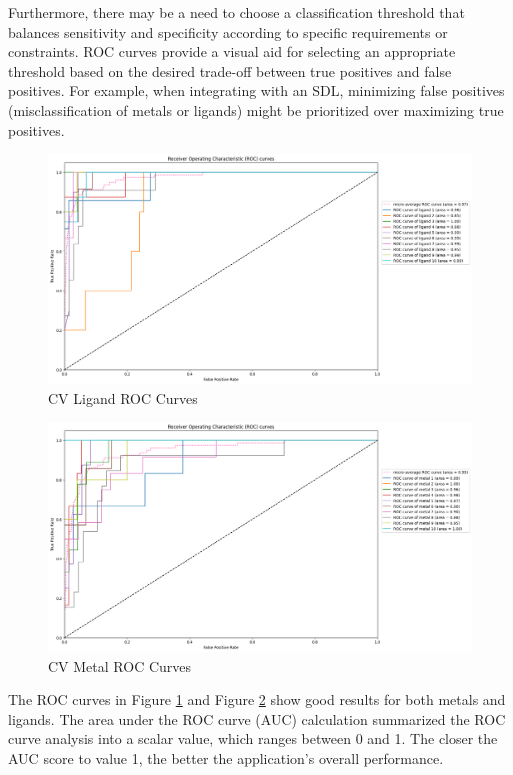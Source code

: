 Furthermore, there may be a need to choose a classification threshold that balances sensitivity and specificity according to specific requirements or constraints. ROC curves provide a visual aid for selecting an appropriate threshold based on the desired trade-off between true positives and false positives. For example, when integrating with an SDL, minimizing false positives (misclassification of metals or ligands) might be prioritized over maximizing true positives.
\begin{figure}[h!]
  \centering
    \includegraphics[width=1.0\textwidth]{figures/ligand_roc.png}
    \caption{CV Ligand ROC Curves}
    \label{ligand_roc}
\end{figure}
\begin{figure}[h!]
  \centering
    \includegraphics[width=1.0\textwidth]{figures/metal_roc.png}
    \caption{CV Metal ROC Curves}
    \label{metal_roc}
\end{figure}
The ROC curves in Figure \ref{ligand_roc} and Figure \ref{metal_roc} show good results for both metals and ligands. The area under the ROC curve (AUC) calculation summarized the ROC curve analysis into a scalar value, which ranges between 0 and 1. The closer the AUC score to value 1, the better the application’s overall performance.
